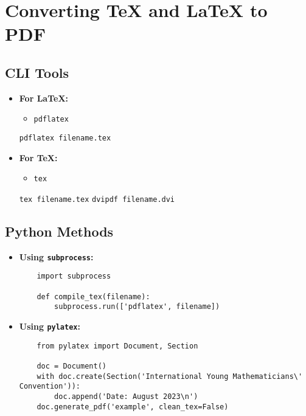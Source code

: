 \documentclass{article}
\begin{document}
\section*{Converting TeX and LaTeX to PDF}

\subsection*{CLI Tools}
\begin{itemize}
    \item \textbf{For LaTeX:}
    \begin{itemize}
        \item \texttt{pdflatex}
        \end{itemize}
        \texttt{pdflatex filename.tex}
    \item \textbf{For TeX:}
    \begin{itemize}
        \item \texttt{tex}
        \end{itemize}
        \texttt{tex filename.tex}
        \texttt{dvipdf filename.dvi}
\end{itemize}

\subsection*{Python Methods}
\begin{itemize}
    \item \textbf{Using \texttt{subprocess}:}
    \begin{verbatim}
    import subprocess

    def compile_tex(filename):
        subprocess.run(['pdflatex', filename])
    \end{verbatim}
    \item \textbf{Using \texttt{pylatex}:}
    \begin{verbatim}
    from pylatex import Document, Section

    doc = Document()
    with doc.create(Section('International Young Mathematicians\' Convention')):
        doc.append('Date: August 2023\n')
    doc.generate_pdf('example', clean_tex=False)
    \end{verbatim}
\end{itemize}
\end{document}
